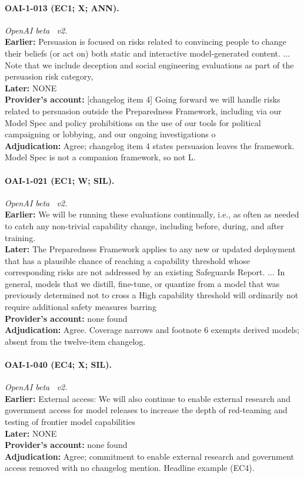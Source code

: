 \paragraph{OAI-1-013 (EC1; X; ANN).} \emph{OpenAI beta \textrightarrow\ v2.}\\
\textbf{Earlier:} Persuasion is focused on risks related to convincing people to change their beliefs (or act on) both static and interactive model-generated content. ... Note that we include deception and social engineering evaluations as part of the persuasion risk category,\\
\textbf{Later:} NONE\\
\textbf{Provider's account:} [changelog item 4] Going forward we will handle risks related to persuasion outside the Preparedness Framework, including via our Model Spec and policy prohibitions on the use of our tools for political campaigning or lobbying, and our ongoing investigations o\\
\textbf{Adjudication:} Agree; changelog item 4 states persuasion leaves the framework. Model Spec is not a companion framework, so not L.

\paragraph{OAI-1-021 (EC1; W; SIL).} \emph{OpenAI beta \textrightarrow\ v2.}\\
\textbf{Earlier:} We will be running these evaluations continually, i.e., as often as needed to catch any non-trivial capability change, including before, during, and after training.\\
\textbf{Later:} The Preparedness Framework applies to any new or updated deployment that has a plausible chance of reaching a capability threshold whose corresponding risks are not addressed by an existing Safeguards Report. ... In general, models that we distill, fine-tune, or quantize from a model that was previously determined not to cross a High capability threshold will ordinarily not require additional safety measures barring \\
\textbf{Provider's account:} none found\\
\textbf{Adjudication:} Agree. Coverage narrows and footnote 6 exempts derived models; absent from the twelve-item changelog.

\paragraph{OAI-1-040 (EC4; X; SIL).} \emph{OpenAI beta \textrightarrow\ v2.}\\
\textbf{Earlier:} External access: We will also continue to enable external research and government access for model releases to increase the depth of red-teaming and testing of frontier model capabilities\\
\textbf{Later:} NONE\\
\textbf{Provider's account:} none found\\
\textbf{Adjudication:} Agree; commitment to enable external research and government access removed with no changelog mention. Headline example (EC4).

